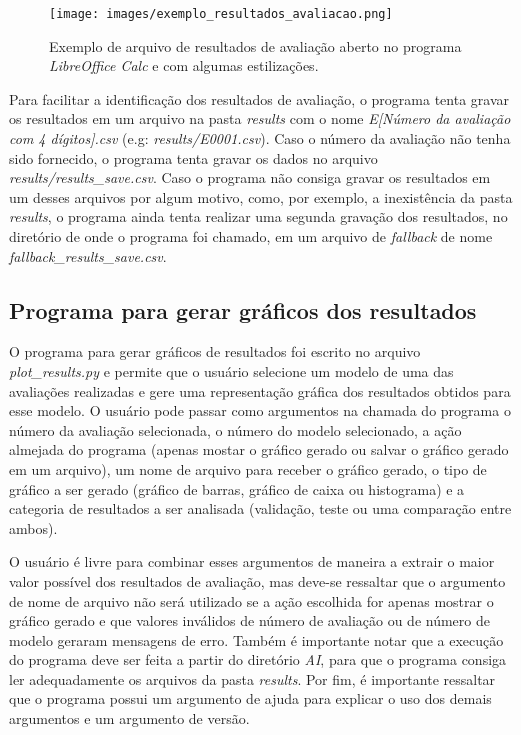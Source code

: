 \begin{figure}[h]
	\centering
	\texttt{[image: images/exemplo\_resultados\_avaliacao.png]}
	\caption{Exemplo de arquivo de resultados de avaliação aberto no programa \textit{LibreOffice Calc} e com algumas estilizações.}
	\label{fig:example_evaluation_results}
\end{figure}

Para facilitar a identificação dos resultados de avaliação, o programa tenta gravar os resultados em um arquivo na pasta \textit{results} com o nome \textit{E[Número da avaliação com 4 dígitos].csv} (e.g: \textit{results/E0001.csv}). Caso o número da avaliação não tenha sido fornecido, o programa tenta gravar os dados no arquivo \textit{results/results\_save.csv}. Caso o programa não consiga gravar os resultados em um desses arquivos por algum motivo, como, por exemplo, a inexistência da pasta \textit{results}, o programa ainda tenta realizar uma segunda gravação dos resultados, no diretório de onde o programa foi chamado, em um arquivo de \textit{fallback} de nome \textit{fallback\_results\_save.csv}.

\subsection{Programa para gerar gráficos dos resultados}

O programa para gerar gráficos de resultados foi escrito no arquivo \textit{plot\_results.py} e permite que o usuário selecione um modelo de uma das avaliações realizadas e gere uma representação gráfica dos resultados obtidos para esse modelo. O usuário pode passar como argumentos na chamada do programa o número da avaliação selecionada, o número do modelo selecionado, a ação almejada do programa (apenas mostar o gráfico gerado ou salvar o gráfico gerado em um arquivo), um nome de arquivo para receber o gráfico gerado, o tipo de gráfico a ser gerado (gráfico de barras, gráfico de caixa ou histograma) e a categoria de resultados a ser analisada (validação, teste ou uma comparação entre ambos).

O usuário é livre para combinar esses argumentos de maneira a extrair o maior valor possível dos resultados de avaliação, mas deve-se ressaltar que o argumento de nome de arquivo não será utilizado se a ação escolhida for apenas mostrar o gráfico gerado e que valores inválidos de número de avaliação ou de número de modelo geraram mensagens de erro. Também é importante notar que a execução do programa deve ser feita a partir do diretório \textit{AI}, para que o programa consiga ler adequadamente os arquivos da pasta \textit{results}. Por fim, é importante ressaltar que o programa possui um argumento de ajuda para explicar o uso dos demais argumentos e um argumento de versão.

